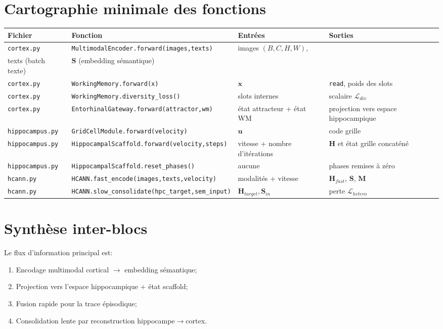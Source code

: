 \documentclass[12pt,a4paper]{article}
\begin{document}
\section{Cartographie minimale des fonctions}
{\small
\setlength{\tabcolsep}{4pt}
\renewcommand{\arraystretch}{1.15}
\begin{longtable}{>{\raggedright\arraybackslash}p{2.4cm} >{\raggedright\arraybackslash}p{4.2cm} >{\raggedright\arraybackslash}p{3.0cm} >{\raggedright\arraybackslash}p{4.2cm}}
\toprule
\textbf{Fichier} & \textbf{Fonction} & \textbf{Entrées} & \textbf{Sorties} \\
\midrule
\endhead
\texttt{cortex.py} &
\texttt{MultimodalEncoder.forward(images,texts)} &
images $(B,C,H,W)$,\\ texts (batch texte) &
$\mathbf{S}$ (embedding sémantique) \\
\texttt{cortex.py} &
\texttt{WorkingMemory.forward(x)} &
$\mathbf{x}$ &
\texttt{read}, poids des slots \\
\texttt{cortex.py} &
\texttt{WorkingMemory.diversity\_loss()} &
slots internes &
scalaire $\mathcal{L}_{div}$ \\
\texttt{cortex.py} &
\texttt{EntorhinalGateway.forward(attractor,wm)} &
état attracteur + état WM &
projection vers espace hippocampique \\
\texttt{hippocampus.py} &
\texttt{GridCellModule.forward(velocity)} &
$\mathbf{u}$ &
code grille \\
\texttt{hippocampus.py} &
\texttt{HippocampalScaffold.forward(velocity,steps)} &
vitesse + nombre d'itérations &
$\mathbf{H}$ et état grille concaténé \\
\texttt{hippocampus.py} &
\texttt{HippocampalScaffold.reset\_phases()} &
aucune &
phases remises à zéro \\
\texttt{hcann.py} &
\texttt{HCANN.fast\_encode(images,texts,velocity)} &
modalités + vitesse &
$\mathbf{H}_{fast}$, $\mathbf{S}$, $\mathbf{M}$ \\
\texttt{hcann.py} &
\texttt{HCANN.slow\_consolidate(hpc\_target,sem\_input)} &
$\mathbf{H}_{target}, \mathbf{S}_{in}$ &
perte $\mathcal{L}_{hetero}$ \\
\bottomrule
\end{longtable}
}

\section{Synthèse inter-blocs}
Le flux d'information principal est:
\begin{enumerate}[leftmargin=*]
    \item Encodage multimodal cortical $\rightarrow$ embedding sémantique;
    \item Projection vers l'espace hippocampique + état scaffold;
    \item Fusion rapide pour la trace épisodique;
    \item Consolidation lente par reconstruction hippocampe$\rightarrow$cortex.
\end{enumerate}
\end{document}
